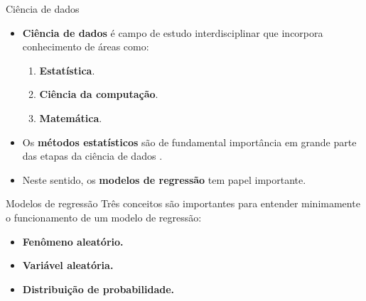 \documentclass[
  ignorenonframetext,
  serif,
  professionalfont,
  usenames,
  dvipsnames,
  aspectratio = 169]{beamer}
\begin{document}
\begin{frame}{Ciência de dados}
\protect\hypertarget{ciuxeancia-de-dados}{}
\begin{itemize}
    \itemsep 2ex
  
  \item \textbf{Ciência de dados} é campo de estudo interdisciplinar que incorpora conhecimento de áreas como:
  
  \begin{enumerate}
    \item \textbf{Estatística}.
    \item \textbf{Ciência da computação}.
    \item \textbf{Matemática}.
  \end{enumerate}

  \item Os \textbf{métodos estatísticos} são de fundamental importância em grande parte das etapas da ciência de dados \citep{weihs2018data}.
  
  \item Neste sentido, os \textbf{modelos de regressão} tem papel importante.
  
  \end{itemize}
\end{frame}

\begin{frame}{Modelos de regressão}
\protect\hypertarget{modelos-de-regressuxe3o}{}
Três conceitos são importantes para entender minimamente o funcionamento
de um modelo de regressão:

\begin{itemize}
  
  \itemsep 2ex
  
  \item \textbf{Fenômeno aleatório.}
  \item \textbf{Variável aleatória.}
  \item \textbf{Distribuição de probabilidade.}
\end{itemize}
\end{frame}
\end{document}
